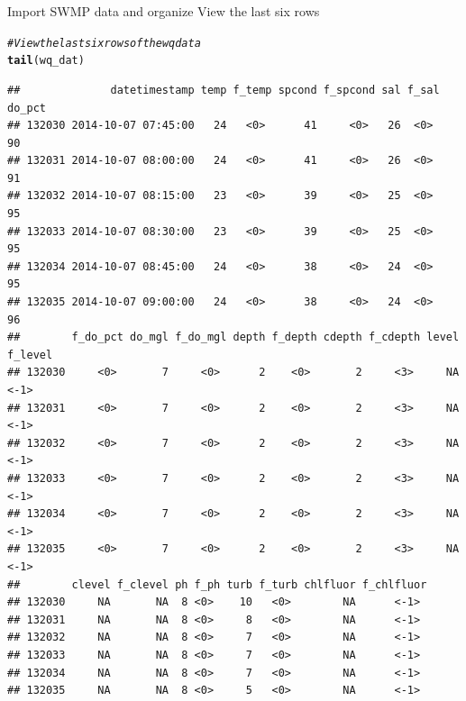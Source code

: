 \documentclass[xcolor=svgnames]{beamer}\usepackage[]{graphicx}\usepackage[]{color}
\makeatletter
\newcommand{\hlcom}[1]{\textcolor[rgb]{0.678,0.584,0.686}{\textit{#1}}}%
\newcommand{\hlstd}[1]{\textcolor[rgb]{0.345,0.345,0.345}{#1}}%
\newcommand{\hlkwd}[1]{\textcolor[rgb]{0.737,0.353,0.396}{\textbf{#1}}}%
\newenvironment{kframe}{%
 \def\at@end@of@kframe{}%
 \ifinner\ifhmode%
  \def\at@end@of@kframe{\end{minipage}}%
  \begin{minipage}{\columnwidth}%
 \fi\fi%
 \def\FrameCommand##1{\hskip\@totalleftmargin \hskip-\fboxsep
 \colorbox{shadecolor}{##1}\hskip-\fboxsep
     \hskip-\linewidth \hskip-\@totalleftmargin \hskip\columnwidth}%
 \MakeFramed {\advance\hsize-\width
   \@totalleftmargin\z@ \linewidth\hsize
   \@setminipage}}%
 {\par\unskip\endMakeFramed%
 \at@end@of@kframe}
\newenvironment{knitrout}{}{} %
\makeatother
\begin{document}
\begin{frame}{Import SWMP data and organize}
View the last six rows
\begin{knitrout}\scriptsize
{}\color{fgcolor}\begin{kframe}
\begin{alltt}
\hlcom{# View the last six rows of the wq data}
\hlkwd{tail}\hlstd{(wq_dat)}
\end{alltt}
\begin{verbatim}
##              datetimestamp temp f_temp spcond f_spcond sal f_sal do_pct
## 132030 2014-10-07 07:45:00   24   <0>      41     <0>   26  <0>      90
## 132031 2014-10-07 08:00:00   24   <0>      41     <0>   26  <0>      91
## 132032 2014-10-07 08:15:00   23   <0>      39     <0>   25  <0>      95
## 132033 2014-10-07 08:30:00   23   <0>      39     <0>   25  <0>      95
## 132034 2014-10-07 08:45:00   24   <0>      38     <0>   24  <0>      95
## 132035 2014-10-07 09:00:00   24   <0>      38     <0>   24  <0>      96
##        f_do_pct do_mgl f_do_mgl depth f_depth cdepth f_cdepth level f_level
## 132030     <0>       7     <0>      2    <0>       2     <3>     NA   <-1> 
## 132031     <0>       7     <0>      2    <0>       2     <3>     NA   <-1> 
## 132032     <0>       7     <0>      2    <0>       2     <3>     NA   <-1> 
## 132033     <0>       7     <0>      2    <0>       2     <3>     NA   <-1> 
## 132034     <0>       7     <0>      2    <0>       2     <3>     NA   <-1> 
## 132035     <0>       7     <0>      2    <0>       2     <3>     NA   <-1> 
##        clevel f_clevel ph f_ph turb f_turb chlfluor f_chlfluor
## 132030     NA       NA  8 <0>    10   <0>        NA      <-1> 
## 132031     NA       NA  8 <0>     8   <0>        NA      <-1> 
## 132032     NA       NA  8 <0>     7   <0>        NA      <-1> 
## 132033     NA       NA  8 <0>     7   <0>        NA      <-1> 
## 132034     NA       NA  8 <0>     7   <0>        NA      <-1> 
## 132035     NA       NA  8 <0>     5   <0>        NA      <-1>
\end{verbatim}
\end{kframe}
\end{knitrout}
\end{frame}
\end{document}
